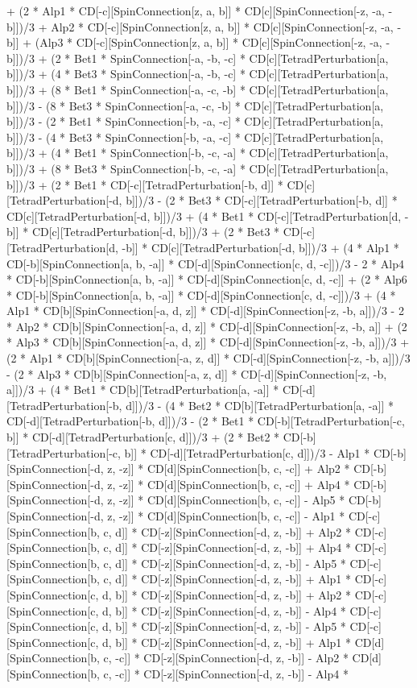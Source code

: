 + (2 * Alp1 * CD[-c][SpinConnection[z, a, b]] * CD[c][SpinConnection[-z, -a, -b]])/3 + Alp2 * CD[-c][SpinConnection[z, a, b]] * CD[c][SpinConnection[-z, -a, -b]] + (Alp3 * CD[-c][SpinConnection[z, a, b]] * CD[c][SpinConnection[-z, -a, -b]])/3 + (2 * Bet1 * SpinConnection[-a, -b, -c] * CD[c][TetradPerturbation[a, b]])/3 + (4 * Bet3 * SpinConnection[-a, -b, -c] * CD[c][TetradPerturbation[a, b]])/3 + (8 * Bet1 * SpinConnection[-a, -c, -b] * CD[c][TetradPerturbation[a, b]])/3 - (8 * Bet3 * SpinConnection[-a, -c, -b] * CD[c][TetradPerturbation[a, b]])/3 - (2 * Bet1 * SpinConnection[-b, -a, -c] * CD[c][TetradPerturbation[a, b]])/3 - (4 * Bet3 * SpinConnection[-b, -a, -c] * CD[c][TetradPerturbation[a, b]])/3 + (4 * Bet1 * SpinConnection[-b, -c, -a] * CD[c][TetradPerturbation[a, b]])/3 + (8 * Bet3 * SpinConnection[-b, -c, -a] * CD[c][TetradPerturbation[a, b]])/3 + (2 * Bet1 * CD[-c][TetradPerturbation[-b, d]] * CD[c][TetradPerturbation[-d, b]])/3 - (2 * Bet3 * CD[-c][TetradPerturbation[-b, d]] * CD[c][TetradPerturbation[-d, b]])/3 + (4 * Bet1 * CD[-c][TetradPerturbation[d, -b]] * CD[c][TetradPerturbation[-d, b]])/3 + (2 * Bet3 * CD[-c][TetradPerturbation[d, -b]] * CD[c][TetradPerturbation[-d, b]])/3 + (4 * Alp1 * CD[-b][SpinConnection[a, b, -a]] * CD[-d][SpinConnection[c, d, -c]])/3 - 2 * Alp4 * CD[-b][SpinConnection[a, b, -a]] * CD[-d][SpinConnection[c, d, -c]] + (2 * Alp6 * CD[-b][SpinConnection[a, b, -a]] * CD[-d][SpinConnection[c, d, -c]])/3 + (4 * Alp1 * CD[b][SpinConnection[-a, d, z]] * CD[-d][SpinConnection[-z, -b, a]])/3 - 2 * Alp2 * CD[b][SpinConnection[-a, d, z]] * CD[-d][SpinConnection[-z, -b, a]] + (2 * Alp3 * CD[b][SpinConnection[-a, d, z]] * CD[-d][SpinConnection[-z, -b, a]])/3 + (2 * Alp1 * CD[b][SpinConnection[-a, z, d]] * CD[-d][SpinConnection[-z, -b, a]])/3 - (2 * Alp3 * CD[b][SpinConnection[-a, z, d]] * CD[-d][SpinConnection[-z, -b, a]])/3 + (4 * Bet1 * CD[b][TetradPerturbation[a, -a]] * CD[-d][TetradPerturbation[-b, d]])/3 - (4 * Bet2 * CD[b][TetradPerturbation[a, -a]] * CD[-d][TetradPerturbation[-b, d]])/3 - (2 * Bet1 * CD[-b][TetradPerturbation[-c, b]] * CD[-d][TetradPerturbation[c, d]])/3 + (2 * Bet2 * CD[-b][TetradPerturbation[-c, b]] * CD[-d][TetradPerturbation[c, d]])/3 - Alp1 * CD[-b][SpinConnection[-d, z, -z]] * CD[d][SpinConnection[b, c, -c]] + Alp2 * CD[-b][SpinConnection[-d, z, -z]] * CD[d][SpinConnection[b, c, -c]] + Alp4 * CD[-b][SpinConnection[-d, z, -z]] * CD[d][SpinConnection[b, c, -c]] - Alp5 * CD[-b][SpinConnection[-d, z, -z]] * CD[d][SpinConnection[b, c, -c]] - Alp1 * CD[-c][SpinConnection[b, c, d]] * CD[-z][SpinConnection[-d, z, -b]] + Alp2 * CD[-c][SpinConnection[b, c, d]] * CD[-z][SpinConnection[-d, z, -b]] + Alp4 * CD[-c][SpinConnection[b, c, d]] * CD[-z][SpinConnection[-d, z, -b]] - Alp5 * CD[-c][SpinConnection[b, c, d]] * CD[-z][SpinConnection[-d, z, -b]] + Alp1 * CD[-c][SpinConnection[c, d, b]] * CD[-z][SpinConnection[-d, z, -b]] + Alp2 * CD[-c][SpinConnection[c, d, b]] * CD[-z][SpinConnection[-d, z, -b]] - Alp4 * CD[-c][SpinConnection[c, d, b]] * CD[-z][SpinConnection[-d, z, -b]] - Alp5 * CD[-c][SpinConnection[c, d, b]] * CD[-z][SpinConnection[-d, z, -b]] + Alp1 * CD[d][SpinConnection[b, c, -c]] * CD[-z][SpinConnection[-d, z, -b]] - Alp2 * CD[d][SpinConnection[b, c, -c]] * CD[-z][SpinConnection[-d, z, -b]] - Alp4 * 